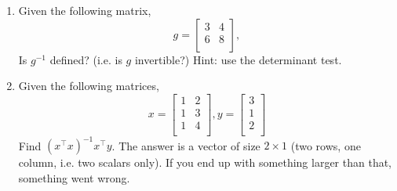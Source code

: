 \documentclass[10pt]{article}
\begin{document}
\begin{enumerate}
\item Given the following matrix,
\[g=
\begin{bmatrix}
3 & 4 \\
6 & 8 \\
\end{bmatrix},
\] Is $g^{-1}$ defined? (i.e. is $g$ invertible?) Hint: use the determinant test.
\item Given the following matrices,
\[x=
\begin{bmatrix}
1&2\\
1&3\\ 
1&4\\
\end{bmatrix},
y=
\begin{bmatrix}
3\\
1\\ 
2\\
\end{bmatrix}
\] Find $(x^{\top}x)^{-1}x^{\top}y$. The answer is a vector of size $2 \times 1$ (two rows, one column, i.e. two scalars only). If you end up with something larger than that, something went wrong.
\end{enumerate}
\end{document}
